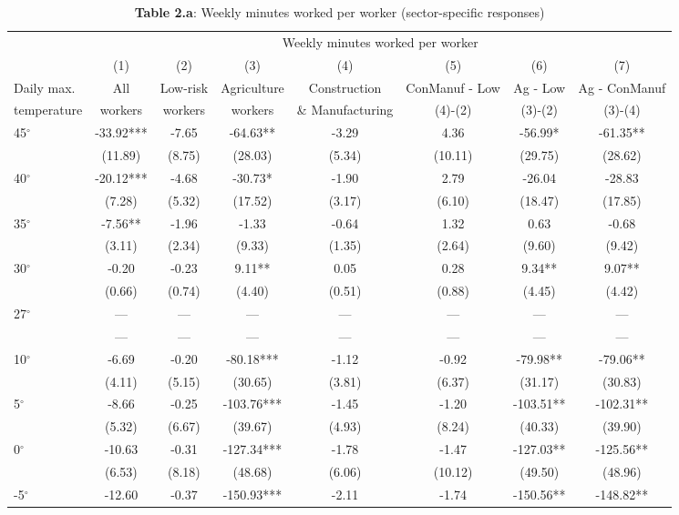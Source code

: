 \begin{table}[H]
\centering
\caption{\textbf{Table 2.a}: Weekly minutes worked per worker (sector-specific responses)}
\setlength{\tabcolsep}{4pt}
\begin{tabular}{lccccccc}
\hline\hline
 & \multicolumn{7}{c}{Weekly minutes worked per worker} \\
\cline{2-8}
 & (1) & (2) & (3) & (4) & (5) & (6) & (7) \\
Daily max. & All & Low-risk & Agriculture & Construction & ConManuf - Low & Ag - Low & Ag - ConManuf \\
temperature & workers & workers & workers &  \& Manufacturing & (4)-(2) & (3)-(2) & (3)-(4) \\
\hline
45$^\circ$ & -33.92*** & -7.65 & -64.63** & -3.29 & 4.36 & -56.99* & -61.35** \\
 & (11.89) & (8.75) & (28.03) & (5.34) & (10.11) & (29.75) & (28.62) \\
40$^\circ$ & -20.12*** & -4.68 & -30.73* & -1.90 & 2.79 & -26.04 & -28.83 \\
 & (7.28) & (5.32) & (17.52) & (3.17) & (6.10) & (18.47) & (17.85) \\
35$^\circ$ & -7.56** & -1.96 & -1.33 & -0.64 & 1.32 & 0.63 & -0.68 \\
 & (3.11) & (2.34) & (9.33) & (1.35) & (2.64) & (9.60) & (9.42) \\
30$^\circ$ & -0.20 & -0.23 & 9.11** & 0.05 & 0.28 & 9.34** & 9.07** \\
 & (0.66) & (0.74) & (4.40) & (0.51) & (0.88) & (4.45) & (4.42) \\
27$^\circ$ & --- & --- & --- & --- & --- & --- & --- \\
 & --- & --- & --- & --- & --- & --- & --- \\
10$^\circ$ & -6.69 & -0.20 & -80.18*** & -1.12 & -0.92 & -79.98** & -79.06** \\
 & (4.11) & (5.15) & (30.65) & (3.81) & (6.37) & (31.17) & (30.83) \\
5$^\circ$ & -8.66 & -0.25 & -103.76*** & -1.45 & -1.20 & -103.51** & -102.31** \\
 & (5.32) & (6.67) & (39.67) & (4.93) & (8.24) & (40.33) & (39.90) \\
0$^\circ$ & -10.63 & -0.31 & -127.34*** & -1.78 & -1.47 & -127.03** & -125.56** \\
 & (6.53) & (8.18) & (48.68) & (6.06) & (10.12) & (49.50) & (48.96) \\
-5$^\circ$ & -12.60 & -0.37 & -150.93*** & -2.11 & -1.74 & -150.56** & -148.82** \\

\end{tabular}
\end{table}
